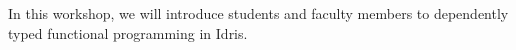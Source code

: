 In this workshop, we will introduce students and faculty members to dependently typed functional programming in Idris.
